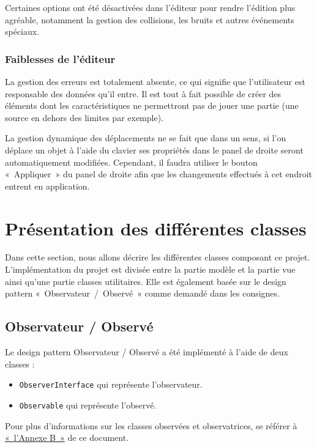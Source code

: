 \documentclass[]{report}
\begin{document}
Certaines options ont été désactivées dans l'éditeur pour rendre l'édition plus agréable,
notamment la gestion des collisions, les bruits et autres événements spéciaux.

\subsubsection{Faiblesses de l'éditeur}

La gestion des erreurs est totalement absente, ce qui signifie que l'utilisateur est 
responsable des données qu'il entre. Il est tout à fait possible de créer des éléments
dont les caractéristiques ne permettront pas de jouer une partie (une source en dehors
des limites par exemple).

La gestion dynamique des déplacements ne se fait que dans un sens, si l'on déplace un objet
à l'aide du clavier ses propriétés dans le panel de droite seront automatiquement modifiées.
Cependant, il faudra utiliser le bouton «~Appliquer~» du panel de droite afin que les changements
effectués à cet endroit entrent en application.

\newpage
\section{Présentation des différentes classes}

Dans cette section, nous allons décrire les différentes classes
composant ce projet.
L'implémentation du projet est divisée entre la partie modèle et la partie vue ainsi 
qu'une partie classes utilitaires.
Elle est également basée sur le design pattern «~Observateur~/~Observé~» comme demandé
dans les consignes. 

\subsection{\label{OO}Observateur / Observé}

Le design pattern Observateur / Observé a été implémenté à l'aide de deux classes : 

\begin{itemize}
    \item \texttt{ObserverInterface} qui représente l'observateur.
    \item \texttt{Observable} qui représente l'observé.
\end{itemize}

Pour plus d'informations sur les classes observées et observatrices, se référer à
\hyperref[AnnexeB]{«~l'Annexe B~»} de ce document.
\end{document}
